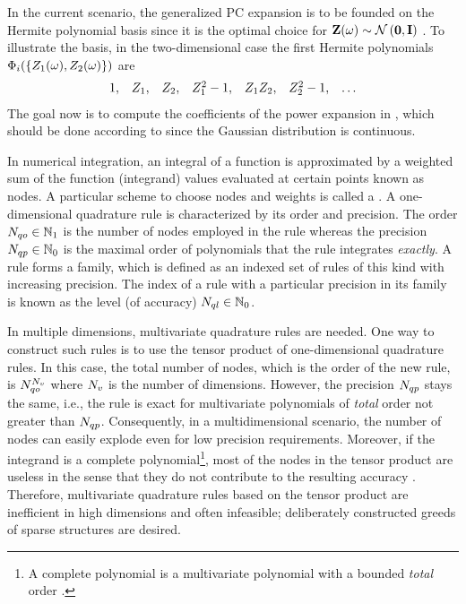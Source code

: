 In the current scenario, the generalized PC expansion is to be founded on the Hermite polynomial basis since it is the optimal choice for $\vZ(\o) \sim \normal{\vZero}{\mI}$ \cite{xiu2002}. To illustrate the basis, in the two-dimensional case the first Hermite polynomials $\Phi_i(\{ Z_1(\omega), Z_2(\omega) \})$ are
\[
  \begin{array}{lllllll}
  1, & Z_1, & Z_2, & Z_1^2 - 1, & Z_1 Z_2, & Z_2^2 - 1, & \dotsc
  \end{array}
\]
The goal now is to compute the coefficients of the power expansion in , which should be done according to  since the Gaussian distribution is continuous.

In numerical integration, an integral of a function is approximated by a weighted sum of the function (integrand) values evaluated at certain points known as nodes. A particular scheme to choose nodes and weights is called a . A one-dimensional quadrature rule is characterized by its order and precision. The order $N_{qo} \in \mathbb{N}_{1}$ is the number of nodes employed in the rule whereas the precision $N_{qp} \in \mathbb{N}_{0}$ is the maximal order of polynomials that the rule integrates \emph{exactly}. A rule forms a family, which is defined as an indexed set of rules of this kind with increasing precision. The index of a rule with a particular precision in its family is known as the level (of accuracy) $N_{ql} \in \mathbb{N}_{0}$.

In multiple dimensions, multivariate quadrature rules are needed. One way to construct such rules is to use the tensor product of one-dimensional quadrature rules. In this case, the total number of nodes, which is the order of the new rule, is $N_{qo}^{N_v}$ where ${N_v}$ is the number of dimensions. However, the precision $N_{qp}$ stays the same, i.e., the rule is exact for multivariate polynomials of \emph{total} order not greater than $N_{qp}$. Consequently, in a multidimensional scenario, the number of nodes can easily explode even for low precision requirements. Moreover, if the integrand is a complete polynomial\footnote{A complete polynomial is a multivariate polynomial with a bounded \emph{total} order \cite{heiss2008}.}, most of the nodes in the tensor product are useless in the sense that they do not contribute to the resulting accuracy \cite{heiss2008}. Therefore, multivariate quadrature rules based on the tensor product are inefficient in high dimensions and often infeasible; deliberately constructed greeds of sparse structures are desired.


